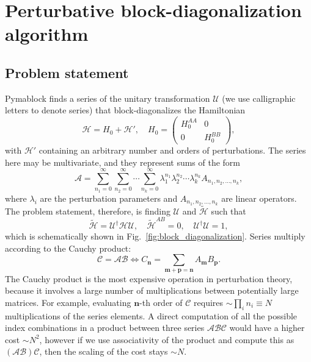 \section{Perturbative block-diagonalization algorithm}

\subsection{Problem statement}

Pymablock finds a series of the unitary transformation $\mathcal{U}$ (we use
calligraphic letters to denote series) that block-diagonalizes the Hamiltonian
%
\begin{equation}
\label{eq:hamiltonian}
\mathcal{H} = H_0 + \mathcal{H}',\quad H_0 = \begin{pmatrix}
H_0^{AA} & 0\\
0 & H_0^{BB}
\end{pmatrix},
\end{equation}
%
with $\mathcal{H}'$ containing an arbitrary number and orders of perturbations.
The series here may be multivariate, and they represent sums of the form
%
\begin{equation}
\mathcal{A} = \sum_{n_1=0}^\infty \sum_{n_2=0}^\infty \cdots \sum_{n_k=0}^\infty \lambda_1^{n_1} \lambda_2^{n_2} \cdots \lambda_k^{n_k} A_{n_1, n_2, \ldots, n_k},
\end{equation}
%
where $\lambda_i$ are the perturbation parameters and $A_{n_1, n_2, \ldots,
n_k}$ are linear operators.
%
The problem statement, therefore, is finding $\mathcal{U}$ and
$\tilde{\mathcal{H}}$ such that
%
\begin{equation}
\label{eq:problem_definition}
\tilde{\mathcal{H}} = \mathcal{U}^\dagger \mathcal{H} \mathcal{U},\quad \tilde{\mathcal{H}}^{AB} = 0,\quad \mathcal{U}^\dagger \mathcal{U} = 1,
\end{equation}
%
which is schematically shown in Fig.~\ref{fig:block_diagonalization}.
Series multiply according to the Cauchy product:
%
$$
\mathcal{C} = \mathcal{A}\mathcal{B} \Leftrightarrow C_\mathbf{n} = \sum_{\mathbf{m} + \mathbf{p} = \mathbf{n}} A_\mathbf{m} B_\mathbf{p}.
$$
%
The Cauchy product is the most expensive operation in perturbation theory,
because it involves a large number of multiplications between potentially large
matrices.
For example, evaluating $\mathbf{n}$-th order of $\mathcal{C}$ requires
$\sim\prod_i n_i \equiv N$ multiplications of the series elements.
A direct computation of all the possible index combinations in a product
between three series $\mathcal{A}\mathcal{B}\mathcal{C}$ would have a higher
cost $\sim N^2$, however if we use associativity of the product and compute
this as $(\mathcal{A}\mathcal{B})\mathcal{C}$, then the scaling of the cost
stays $\sim N$.

